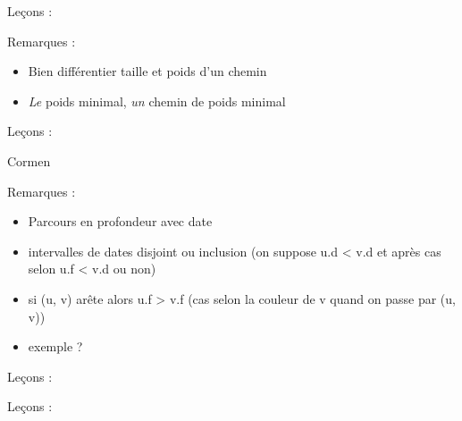 \documentclass[../agregation.tex]{subfiles}
\begin{document}


Leçons :
\begin{itemize}
\end{itemize}

Remarques :
\begin{itemize}
	\item Bien différentier taille et poids d'un chemin
	\item \emph{Le} poids minimal, \emph{un} chemin de poids minimal
\end{itemize}

Leçons :
\begin{itemize}
\end{itemize}
Cormen

Remarques :
\begin{itemize}
	\item Parcours en profondeur avec date
	\item intervalles de dates disjoint ou inclusion (on suppose u.d < v.d et après cas selon u.f < v.d ou non)
	\item si (u, v) arête alors u.f > v.f (cas selon la couleur de v quand on passe par (u, v))
	\item exemple ?
\end{itemize}


Leçons :
\begin{itemize}
\end{itemize}




Leçons :
\begin{itemize}
\end{itemize}
\end{document}
